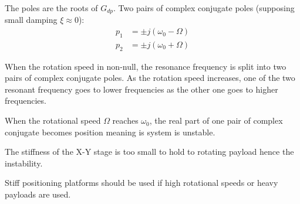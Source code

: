 \documentclass{ISMA_USD2020}
\begin{document}
The poles are the roots of \(G_{dp}\).
Two pairs of complex conjugate poles (supposing small damping \(\xi \approx 0\)):
\begin{subequations}
  \begin{align}
    p_1 &= \pm j (\omega_0 - \Omega) \\
    p_2 &= \pm j (\omega_0 + \Omega)
  \end{align}
\end{subequations}

When the rotation speed in non-null, the resonance frequency is split into two pairs of complex conjugate poles.
As the rotation speed increases, one of the two resonant frequency goes to lower frequencies as the other one goes to higher frequencies.

When the rotational speed \(\Omega\) reaches \(\omega_0\), the real part of one pair of complex conjugate becomes position meaning is system is unstable.

The stiffness of the X-Y stage is too small to hold to rotating payload hence the instability.

Stiff positioning platforms should be used if high rotational speeds or heavy payloads are used.
\end{document}
